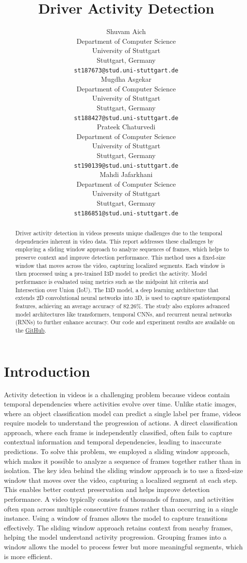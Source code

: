 \documentclass{article}
\title{Driver Activity Detection}
\author{%
  Shuvam Aich \\
  Department of Computer Science\\
  University of Stuttgart\\
  Stuttgart, Germany \\
  \texttt{st187673@stud.uni-stuttgart.de} \\
  \And
  Mugdha Asgekar \\
  Department of Computer Science\\
  University of Stuttgart\\
  Stuttgart, Germany \\
  \texttt{st188427@stud.uni-stuttgart.de} \\
  \AND
  Prateek Chaturvedi \\
  Department of Computer Science\\
  University of Stuttgart\\
  Stuttgart, Germany \\
  \texttt{st190139@stud.uni-stuttgart.de} \\
  \And
  Mahdi Jafarkhani \\
  Department of Computer Science\\
  University of Stuttgart\\
  Stuttgart, Germany \\
  \texttt{st186851@stud.uni-stuttgart.de} \\
}
\begin{document}
\maketitle


\begin{abstract}
Driver activity detection in videos presents unique challenges due to the temporal dependencies inherent in video data. This report addresses these challenges by employing a sliding window approach to analyze sequences of frames, which helps to preserve context and improve detection performance. This method uses a fixed-size window that moves across the video, capturing localized segments. Each window is then processed using a pre-trained I3D model to predict the activity. Model performance is evaluated using metrics such as the midpoint hit criteria and Intersection over Union (IoU). The I3D model, a deep learning architecture that extends 2D convolutional neural networks into 3D, is used to capture spatiotemporal features, achieving an average accuracy of 82.26\%. The study also explores advanced model architectures like transformers, temporal CNNs, and recurrent neural networks (RNNs) to further enhance accuracy. Our code and experiment results are available on
the \href{https://github.com/M-Jafarkhani/Drive\&ActInferenceDemo}{GitHub}.
\end{abstract}


\section{Introduction}

Activity detection in videos is a challenging problem because videos contain temporal dependencies where activities evolve over time. Unlike static images, where an object classification model can predict a single label per frame, videos require models to understand the progression of actions. A direct classification approach, where each frame is independently classified, often fails to capture contextual information and temporal dependencies, leading to inaccurate predictions. To solve this problem, we employed a sliding window approach, which makes it possible to analyze a sequence of frames together rather than in isolation. The key idea behind the sliding window approach is to use a fixed-size window that moves over the video, capturing a localized segment at each step. This enables better context preservation and helps improve detection performance. A video typically consists of thousands of frames, and activities often span across multiple consecutive frames rather than occurring in a single instance. Using a window of frames allows the model to capture transitions effectively. The sliding window approach retains context from nearby frames, helping the model understand activity progression. Grouping frames into a window allows the model to process fewer but more meaningful segments, which is more efficient.
\end{document}
